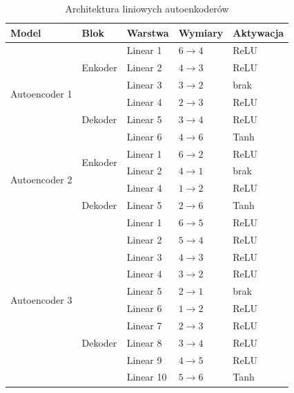 \begin{table}[H]
\centering
\caption{Architektura liniowych autoenkoderów}
\label{tab:autoencoder_architecture}
\begin{tabular}{lllll}
\toprule
\textbf{Model} & \textbf{Blok} & \textbf{Warstwa} & \textbf{Wymiary} & \textbf{Aktywacja} \\
\midrule
\multirow{6}{*}{Autoencoder 1}
 & \multirow{3}{*}{Enkoder}
 & Linear 1 & $6 \rightarrow 4$ & ReLU \\
 &  & Linear 2 & $4 \rightarrow 3$ & ReLU \\
 &  & Linear 3 & $3 \rightarrow 2$ & brak \\
\cmidrule(lr){2-5}
 & \multirow{3}{*}{Dekoder}
 & Linear 4 & $2 \rightarrow 3$ & ReLU \\
 &  & Linear 5 & $3 \rightarrow 4$ & ReLU \\
 &  & Linear 6 & $4 \rightarrow 6$ & Tanh \\

 \midrule
\multirow{4}{*}{Autoencoder 2}
 & \multirow{2}{*}{Enkoder}
 & Linear 1 & $6 \rightarrow 2$ & ReLU \\
 &  & Linear 2 & $4 \rightarrow 1$ & brak \\
 
\cmidrule(lr){2-5}
 & \multirow{3}{*}{Dekoder}
 & Linear 4 & $1 \rightarrow 2$ & ReLU \\
 &  & Linear 5 & $2 \rightarrow 6$ & Tanh \\

 \midrule
\multirow{10}{*}{Autoencoder 3}
 & \multirow{5}{*}{Enkoder}
 & Linear 1 & $6 \rightarrow 5$ & ReLU \\
 &  & Linear 2 & $5 \rightarrow 4$ & ReLU \\
 &  & Linear 3 & $4 \rightarrow 3$ & ReLU \\
 &  & Linear 4 & $3 \rightarrow 2$ & ReLU \\
 &  & Linear 5 & $2 \rightarrow 1$ & brak \\
\cmidrule(lr){2-5}
 & \multirow{5}{*}{Dekoder}
 & Linear 6 & $1 \rightarrow 2$ & ReLU \\
 &  & Linear 7 & $2 \rightarrow 3$ & ReLU \\
 &  & Linear 8 & $3 \rightarrow 4$ & ReLU \\
 &  & Linear 9 & $4 \rightarrow 5$ & ReLU \\
 &  & Linear 10 & $5 \rightarrow 6$ & Tanh \\
\bottomrule
\end{tabular}
\end{table}

